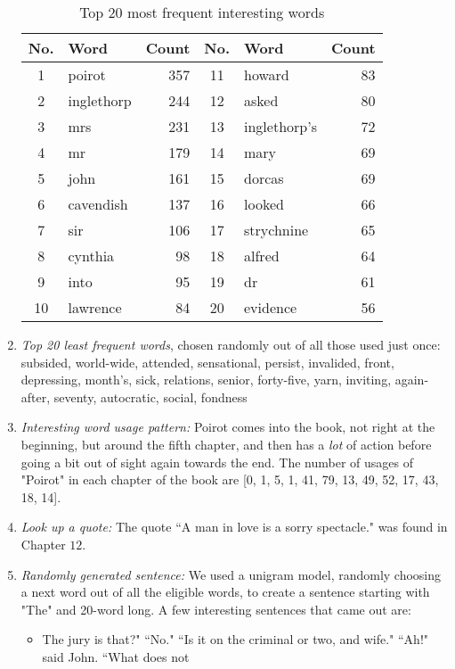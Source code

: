 \documentclass[12pt]{article}
\begin{document}
\begin{enumerate}
\begin{table}[H]
\begin{tabular}{c|l|r||c|l|r}
            \toprule
            No. & Word & Count & No. & Word & Count \\
            \midrule
            1 & poirot & 357 & 11 & howard & 83 \\
            2 & inglethorp & 244 & 12 & asked & 80 \\
            3 & mrs & 231 & 13 & inglethorp's & 72 \\
            4 & mr & 179 & 14 & mary & 69 \\
            5 & john & 161 & 15 & dorcas & 69 \\
            6 & cavendish & 137 & 16 & looked & 66 \\
            7 & sir & 106 & 17 & strychnine & 65 \\
            8 & cynthia & 98 & 18 & alfred & 64 \\
            9 & into & 95 & 19 & dr & 61 \\
            10 & lawrence & 84 & 20 & evidence & 56 \\
            \bottomrule
          \end{tabular}
          \caption{Top 20 most frequent interesting words}
          \label{top20int}
        \end{table}
  \item \textit{Top 20 least frequent words}, chosen randomly out of all those used just once: \\ subsided, world-wide, attended, sensational, persist, invalided, front, depressing, month's, sick, relations, senior, forty-five, yarn, inviting, again-after, seventy, autocratic, social, fondness
  \item \textit{Interesting word usage pattern:} Poirot comes into the book, not right at the beginning, but around the fifth chapter, and then has a \textit{lot} of action before going a bit out of sight again towards the end. The number of usages of "Poirot" in each chapter of the book are [0, 1, 5, 1, 41, 79, 13, 49, 52, 17, 43, 18, 14].
  \item \textit{Look up a quote:} The quote ``A man in love is a sorry spectacle." was found in Chapter $12$.
  \item \textit{Randomly generated sentence:} We used a unigram model, randomly choosing a next word out of all the eligible words, to create a sentence starting with "The" and 20-word long. A few interesting sentences that came out are:
            \begin{itemize}
              \item The jury is that?" ``No." ``Is it on the criminal or two, and wife." ``Ah!" said John. ``What does not

\end{itemize}
\end{enumerate}
\end{document}
